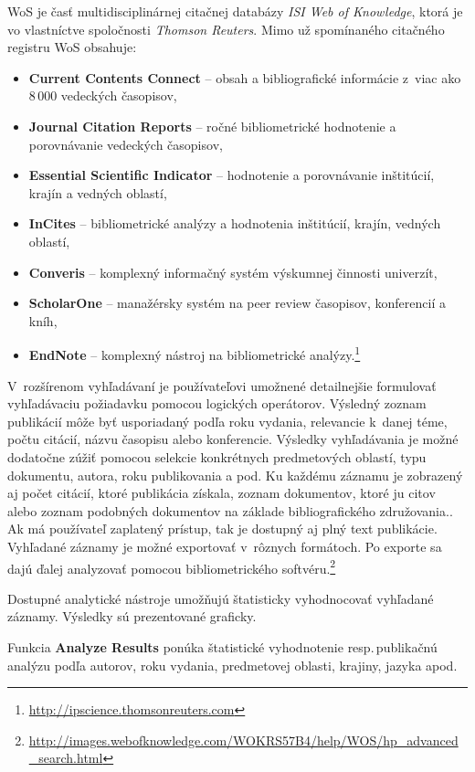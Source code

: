 WoS je časť multidisciplinárnej citačnej databázy \emph{ISI Web of Knowledge},
ktorá je vo vlastníctve spoločnosti \emph{Thomson Reuters}.  Mimo už spomínaného
citačného registru WoS obsahuje:


\begin{itemize}
\item \textbf{Current Contents Connect} -- obsah a bibliografické informácie
z~viac ako 8\,000 vedeckých časopisov,
\item \textbf{Journal Citation Reports} -- ročné bibliometrické hodnotenie a
  porovnávanie vedeckých časopisov,
\item \textbf{Essential Scientific Indicator} -- hodnotenie a porovnávanie
  inštitúcií, krajín a vedných oblastí,
\item \textbf{InCites} -- bibliometrické analýzy a hodnotenia inštitúcií,
  krajín, vedných oblastí,
\item \textbf{Converis} -- komplexný informačný systém výskumnej činnosti
  univerzít,
\item \textbf{ScholarOne} -- manažérsky systém na peer review časopisov,
  konferencií a kníh,
\item \textbf{EndNote} -- komplexný nástroj na bibliometrické
  analýzy.\footnote{\url{http://ipscience.thomsonreuters.com}}
\end{itemize}

V~rozšírenom vyhľadávaní je používateľovi umožnené detailnejšie formulovať
vyhľadávaciu požiadavku pomocou logických operátorov.  Výsledný zoznam
publikácií môže byť usporiadaný podľa roku vydania, relevancie k~danej téme,
počtu citácií, názvu časopisu alebo konferencie.  Výsledky vyhľadávania je možné
dodatočne zúžiť pomocou selekcie konkrétnych predmetových oblastí, typu
dokumentu, autora, roku publikovania a pod.  Ku každému záznamu je zobrazený aj
počet citácií, ktoré publikácia získala, zoznam dokumentov, ktoré ju citov
alebo zoznam podobných dokumentov na základe bibliografického združovania..  Ak
má používateľ zaplatený prístup, tak je dostupný aj plný text publikácie.
Vyhľadané záznamy je možné exportovať v~rôznych formátoch.  Po exporte sa dajú
ďalej analyzovať pomocou bibliometrického
softvéru.\footnote{\url{http://images.webofknowledge.com/WOKRS57B4/help/WOS/hp_advanced_search.html}}

Dostupné analytické nástroje umožňujú štatisticky vyhodnocovať vyhľadané
záznamy.  Výsledky sú prezentované graficky.

Funkcia \textbf{Analyze Results} ponúka štatistické vyhodnotenie
resp.\,publikačnú analýzu podľa autorov, roku vydania, predmetovej oblasti,
krajiny, jazyka apod.


